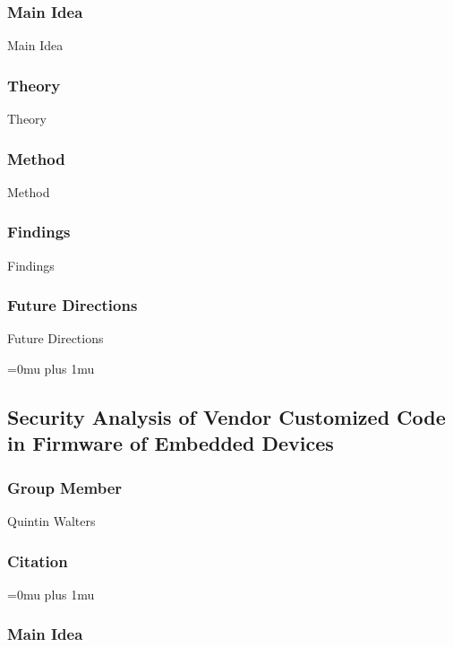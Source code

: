 \subsubsection{Main Idea}

\noindent
Main Idea

\subsubsection{Theory}

\noindent
Theory

\subsubsection{Method}

\noindent
Method

\subsubsection{Findings}

\noindent
Findings

\subsubsection{Future Directions}

\noindent
Future Directions 

\Urlmuskip=0mu plus 1mu\relax

\noindent
\subsection{Security Analysis of Vendor Customized Code in Firmware of Embedded Devices}

\subsubsection{Group Member}

\noindent
Quintin Walters

\noindent
\subsubsection{Citation}

\Urlmuskip=0mu plus 1mu\relax

\subsubsection{Main Idea}

